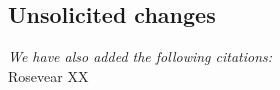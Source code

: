 \documentclass[tc, manuscript]{copernicus}
\begin{document}
\subsection{Unsolicited changes}

\textit{We have also added the following citations:}\\
Rosevear XX
\end{document}
